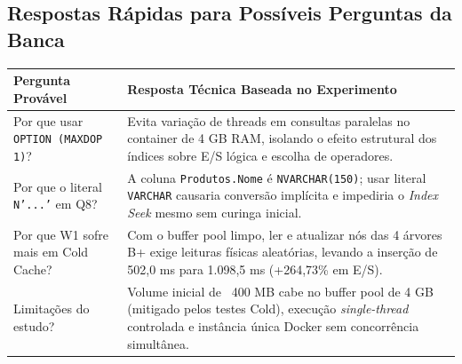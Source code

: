 \documentclass[10pt,a4paper]{article}
\begin{document}
\subsection*{Respostas Rápidas para Possíveis Perguntas da Banca}
\begin{center}
\small
\renewcommand{\arraystretch}{1.15}
\begin{tabularx}{\linewidth}{@{} p{4.6cm} X @{}}
\toprule
\rowcolor{BrandBg}
\textbf{Pergunta Provável} & \textbf{Resposta Técnica Baseada no Experimento} \\
\midrule
Por que usar \texttt{OPTION (MAXDOP 1)}? & Evita variação de threads em consultas paralelas no container de 4 GB RAM, isolando o efeito estrutural dos índices sobre E/S lógica e escolha de operadores. \\
Por que o literal \texttt{N'...'} em Q8? & A coluna \texttt{Produtos.Nome} é \texttt{NVARCHAR(150)}; usar literal \texttt{VARCHAR} causaria conversão implícita e impediria o \emph{Index Seek} mesmo sem curinga inicial. \\
Por que W1 sofre mais em Cold Cache? & Com o buffer pool limpo, ler e atualizar nós das 4 árvores B+ exige leituras físicas aleatórias, levando a inserção de 502,0 ms para 1.098,5 ms (+264,73\% em E/S). \\
Limitações do estudo? & Volume inicial de ~400 MB cabe no buffer pool de 4 GB (mitigado pelos testes Cold), execução \emph{single-thread} controlada e instância única Docker sem concorrência simultânea. \\
\bottomrule
\end{tabularx}
\end{center}
\end{document}
